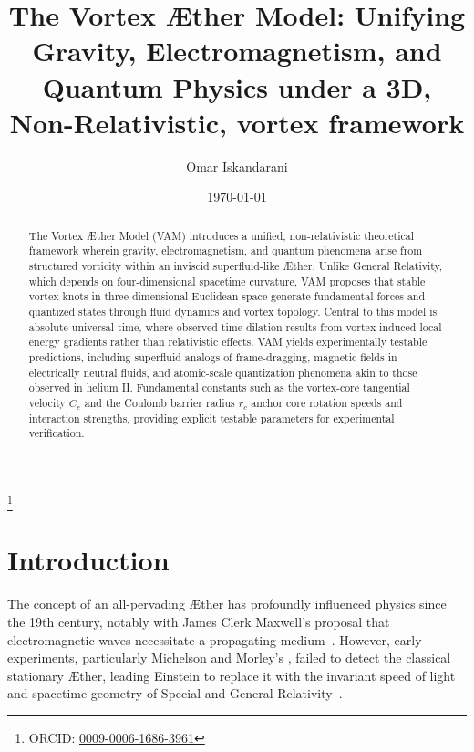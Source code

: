 \documentclass[aps,preprint,superscriptaddress]{revtex4-2}
\begin{document}
    \author{Omar Iskandarani}
    \title{The Vortex Æther Model: Unifying Gravity, Electromagnetism, and Quantum Physics under a 3D, Non-Relativistic, vortex framework}
    \date{\today}
    \thanks{ORCID: \href{https://orcid.org/0009-0006-1686-3961}{0009-0006-1686-3961}}

    \begin{abstract}
        The Vortex Æther Model (VAM) introduces a unified, non-relativistic theoretical framework wherein gravity, electromagnetism, and quantum phenomena arise from structured vorticity within an inviscid superfluid-like Æther. Unlike General Relativity, which depends on four-dimensional spacetime curvature, VAM proposes that stable vortex knots in three-dimensional Euclidean space generate fundamental forces and quantized states through fluid dynamics and vortex topology. Central to this model is absolute universal time, where observed time dilation results from vortex-induced local energy gradients rather than relativistic effects. VAM yields experimentally testable predictions, including superfluid analogs of frame-dragging, magnetic fields in electrically neutral fluids, and atomic-scale quantization phenomena akin to those observed in helium II. Fundamental constants such as the vortex-core tangential velocity $C_e$ and the Coulomb barrier radius $r_c$ anchor core rotation speeds and interaction strengths, providing explicit testable parameters for experimental verification.
    \end{abstract}

\maketitle

\section{Introduction}

    The concept of an all-pervading Æther has profoundly influenced physics since the 19th century, notably with James Clerk Maxwell’s proposal that electromagnetic waves necessitate a propagating medium~\cite{maxwell1865dynamical}. However, early experiments, particularly Michelson and Morley's \cite{michelson1887relative}, failed to detect the classical stationary Æther, leading Einstein to replace it with the invariant speed of light and spacetime geometry of Special and General Relativity~\cite{einstein1916foundation}.
\end{document}
